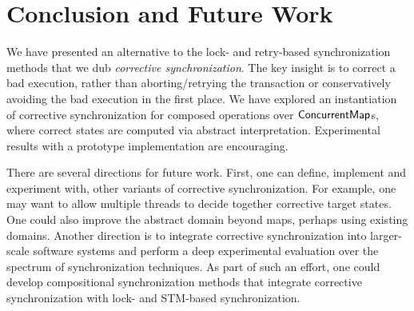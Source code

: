 \section{Conclusion and Future Work}

We have presented an alternative to the lock- and retry-based synchronization methods that we dub \emph{corrective synchronization}. The key insight is to correct a bad execution, rather than aborting/retrying the transaction or conservatively avoiding the bad execution in the first place. We have explored an instantiation of corrective synchronization for composed operations over ${\sf ConcurrentMap}$s, where correct states are computed via abstract interpretation.
%
Experimental results with a prototype implementation are encouraging.

There are several directions for future work.
%
First, one can define, implement and experiment with, other variants
of corrective synchronization.  For example, one may want to allow
multiple threads to decide together corrective target states.  One
could also improve the abstract domain beyond maps, perhaps using
existing domains.
%
Another direction is to integrate corrective synchronization into larger-scale
software systems and perform a deep experimental evaluation over the spectrum
of synchronization techniques.
As part of such an effort, one could develop compositional synchronization methods that integrate corrective synchronization with lock- and STM-based synchronization.

